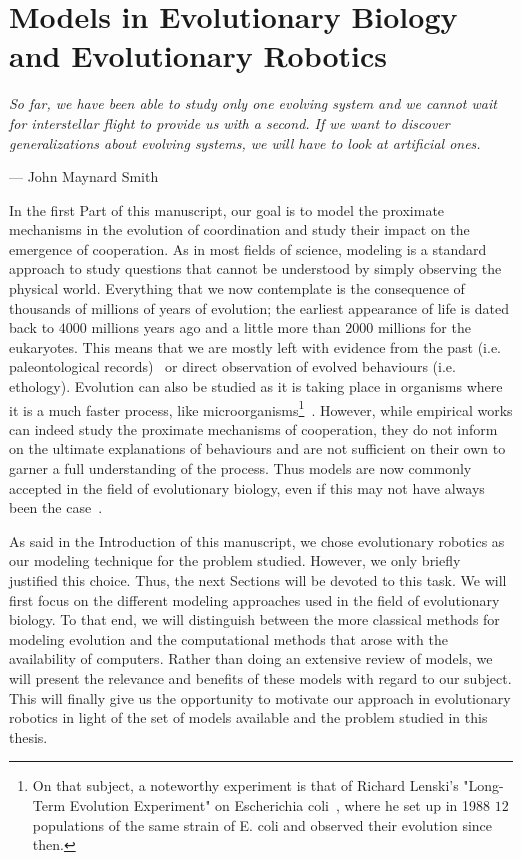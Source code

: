 \chapter{Models in Evolutionary Biology and Evolutionary Robotics}
\label{chapter:model}

\epigraph{\textit{So far, we have been able to study only one evolving system and we cannot wait for interstellar flight to provide us with a second. If we want to discover generalizations about evolving systems, we will have to look at artificial ones.}}{--- \textup{John Maynard Smith}}

\setcounter{secnumdepth}{1}
\setcounter{minitocdepth}{2}
\minitoc[n] %

In the first Part of this manuscript, our goal is to model the proximate mechanisms in the evolution of coordination and study their impact on the emergence of cooperation. As in most fields of science, modeling is a standard approach to study questions that cannot be understood by simply observing the physical world. Everything that we now contemplate is the consequence of thousands of millions of years of evolution; the earliest appearance of life is dated back to $4000$ millions years ago and a little more than $2000$ millions for the eukaryotes. This means that we are mostly left with evidence from the past (i.e. paleontological records)~\parencite{Aiello1995, Wrangham1999} or direct observation of evolved behaviours (i.e. ethology). Evolution can also be studied as it is taking place in organisms where it is a much faster process, like microorganisms\footnote{On that subject, a noteworthy experiment is that of Richard Lenski's "Long-Term Evolution Experiment" on Escherichia coli~\parencite{Fox2015}, where he set up in 1988 $12$ populations of the same strain of E. coli and observed their evolution since then.}~\parencite{Elena2003}. However, while empirical works can indeed study the proximate mechanisms of cooperation, they do not inform on the ultimate explanations of behaviours and are not sufficient on their own to garner a full understanding of the process. Thus models are now commonly accepted in the field of evolutionary biology, even if this may not have always been the case~\parencite{Shou2015}. 

As said in the Introduction of this manuscript, we chose evolutionary robotics as our modeling technique for the problem studied. However, we only briefly justified this choice. Thus, the next Sections will be devoted to this task. We will first focus on the different modeling approaches used in the field of evolutionary biology. To that end, we will distinguish between the more classical methods for modeling evolution and the computational methods that arose with the availability of computers. Rather than doing an extensive review of models, we will present the relevance and benefits of these models with regard to our subject. This will finally give us the opportunity to motivate our approach in evolutionary robotics in light of the set of models available and the problem studied in this thesis.


